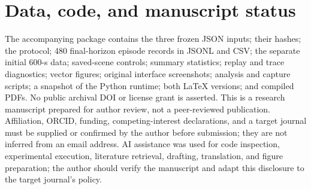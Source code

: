 \documentclass[11pt]{article}
\begin{document}
\section*{Data, code, and manuscript status}
The accompanying package contains the three frozen JSON inputs; their hashes; the protocol; 480 final-horizon episode records in JSONL and CSV; the separate initial 600-s data; saved-scene controls; summary statistics; replay and trace diagnostics; vector figures; original interface screenshots; analysis and capture scripts; a snapshot of the Python runtime; both LaTeX versions; and compiled PDFs. No public archival DOI or license grant is asserted. This is a research manuscript prepared for author review, not a peer-reviewed publication. Affiliation, ORCID, funding, competing-interest declarations, and a target journal must be supplied or confirmed by the author before submission; they are not inferred from an email address. AI assistance was used for code inspection, experimental execution, literature retrieval, drafting, translation, and figure preparation; the author should verify the manuscript and adapt this disclosure to the target journal's policy.

\FloatBarrier
\appendix
\end{document}
